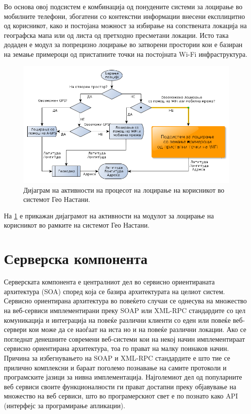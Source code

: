 Во основа овој
подсистем е комбинација од понудените системи за лоцирање во мобилните телефони,
збогатени со контекстни информации внесени експлицитно од корисникот, како и
постојана можност за избирање на сопствената локација на географска мапа или од
листа од претходно пресметани локации. Исто така додаден е модул за попрецизно
лоцирање во затворени простории кои е базиран на земање примероци од пристапните
точки на постојната Wi-Fi инфраструктура.

\begin{figure}[htb]
\centering
\includegraphics[scale=0.4]{images/locating_flow}
\caption{Дијаграм на активности на процесот на лоцирање на корисникот во
системот Гео Настани.}
\label{fig:locating_flow}
\end{figure}
 
На \ref{fig:locating_flow} е прикажан дијаграмот на активности на модулот
за лоцирање на корисникот во рамките на системот Гео Настани. 

\section{Серверска компонента} 

Серверската компонента е централниот дел во сервисно
ориентираната архитектура (SOA) според која се базира архитектурата на целиот систем. Сервисно
ориентирана архитектура во повеќето случаи се однесува на множество на
веб-сервиси имплементирани преку SOAP или XML-RPC стандардите со цел
комуникација и интеграција на повеќе различни клиенти со еден или повеќе
веб-сервери кои може да се наоѓаат на иста но и на повеќе различни локации. Ако
се погледнат денешните современи веб-системи кои на некој начин имплементираат
сервисно ориентирана архитектура, тоа го прават на малку поинаков начин. Причина
за избегнувањето на SOAP и XML-RPC стандардите е што тие се прилично комплексни
и бараат поголемо познавање на самите протоколи и програмските јазици за нивна
имплементација. Најголемиот дел од популарните веб сервиси своите
функционалности ги прават достапни преку објавување на множество на веб сервиси,
што во програмерскиот свет е по познато како API (интерфејс за програмирање
апликации).

